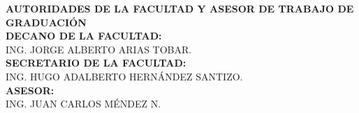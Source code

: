 \newpage
\thispagestyle{empty} 
\begin{center}
    \vspace*{1.5cm}
    {\large\bfseries AUTORIDADES DE LA FACULTAD Y ASESOR DE TRABAJO DE GRADUACIÓN}\\[2cm]
    
    {\bfseries DECANO DE LA FACULTAD:}\\
    ING. JORGE ALBERTO ARIAS TOBAR.\\[1.5cm]
    
    {\bfseries SECRETARIO DE LA FACULTAD:}\\
    ING. HUGO ADALBERTO HERNÁNDEZ SANTIZO.\\[1.5cm]
    
    {\bfseries ASESOR:}\\
    ING. JUAN CARLOS MÉNDEZ N.\\[2.5cm]
\end{center}